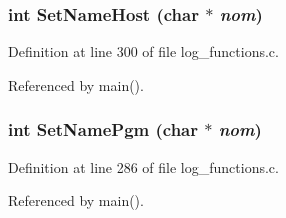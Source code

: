 \subsubsection{\setlength{\rightskip}{0pt plus 5cm}int Set\-Name\-Host (char $\ast$ {\em nom})}\label{log__functions_8c_a51}




Definition at line 300 of file log\_\-functions.c.

Referenced by main().
\subsubsection{\setlength{\rightskip}{0pt plus 5cm}int Set\-Name\-Pgm (char $\ast$ {\em nom})}\label{log__functions_8c_a50}




Definition at line 286 of file log\_\-functions.c.

Referenced by main().